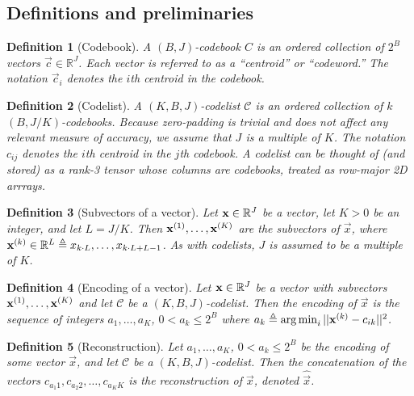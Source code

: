 \documentclass[]{article}
\newtheorem{definition}{Definition}[section]
\begin{document}
\subsection{Definitions and preliminaries}

\begin{definition}[Codebook]
A $(B, J)$-\textit{codebook} $C$ is an ordered collection of $2^B$ vectors $\vec{c} \in \mathbb{R}^J$. Each vector is referred to as a ``centroid'' or ``codeword.'' The notation $\vec{c}_i$ denotes the $i$th centroid in the codebook.
\end{definition}

\begin{definition}[Codelist]
A $(K, B, J)$-codelist $\mathcal{C}$ is an ordered collection of $k$ $(B, J / K)$-codebooks. Because zero-padding is trivial and does not affect any relevant measure of accuracy, we assume that $J$ is a multiple of $K$. The notation $c_{ij}$ denotes the $i$th centroid in the $j$th codebook. A codelist can be thought of (and stored) as a rank-3 tensor whose columns are codebooks, treated as row-major 2D arrrays.
\end{definition}

\begin{definition}[Subvectors of a vector]
Let $\mathbf{x} \in \mathbb{R}^J$ be a vector, let $K > 0$ be an integer, and let $L = J / K$. Then $\mathbf{x}^{(1)},\ldots,\mathbf{x}^{(K)}$ are the subvectors of $\vec{x}$, where $\mathbf{x}^{(k)} \in \mathbb{R}^L \triangleq x_{k\cdot L},\ldots,x_{k\cdot L + L - 1}$. As with codelists, $J$ is assumed to be a multiple of $K$.
\end{definition}

\begin{definition}[Encoding of a vector]
Let $\mathbf{x} \in \mathbb{R}^J$ be a vector with subvectors $\mathbf{x}^{(1)},\ldots,\mathbf{x}^{(K)}$ and let $\mathcal{C}$ be a $(K, B, J)$-codelist. Then the encoding of $\vec{x}$ is the sequence of integers $a_1,\ldots,a_K$, $0 < a_k \le 2^B$ where $a_k \triangleq \operatorname*{arg\,min}_i ||\mathbf{x}^{(k)} - c_{ik}||^2$.
\end{definition}

\begin{definition}[Reconstruction]
Let $a_1,\ldots,a_K$, $0 < a_k \le 2^B$ be the encoding of some vector $\vec{x}$, and let $\mathcal{C}$ be a $(K, B, J)$-codelist. Then the concatenation of the vectors $c_{a_{1}1},c_{a_{2}2},\ldots,c_{a_{K}K}$ is the reconstruction of $\vec{x}$, denoted $\hat{\vec{x}}$.
\end{definition}
\end{document}
